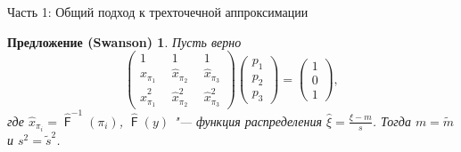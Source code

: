 \documentclass[ucs, notheorems, handout]{beamer}
\newtheorem{proposition}[theorem]{Предложение (Swanson)}
\DeclareMathOperator{\F}{\mathsf{F}}
\begin{document}
	\begin{frame}{Часть 1: Общий подход к трехточечной аппроксимации}
		\begin{proposition}\label{pr1}
			Пусть верно 
			\begin{equation*}
				\begin{pmatrix} 
					1&1&1\\ 
					\hat{x}_{\pi_{1}}~~ &  \hat{x}_{\pi_{2}}~~  & \hat{x}_{\pi_{3}} \\ 
					\hat{x}_{\pi_{1}}^{2}~~&\hat{x}_{\pi_{2}}^{2}~~  &\hat{x}_{\pi_{3}}^{2}
				\end{pmatrix}
				\begin{pmatrix}p_{1}\\p_{2}\\ p_{3}\end{pmatrix}= \begin{pmatrix}1\\0\\1 \end{pmatrix},\label{4}
			\end{equation*}
			где $\hat{x}_{\pi_{i}} = \hat{\F}^{-1}(\pi_{i})$, $\hat{\F}(y)$ "--- функция распределения $\displaystyle{\hat{\xi} = \frac{\xi-m}{s}}$. Тогда $m=\tilde{m}$ и $s^{2} = \tilde{s}^{2}$.
		\end{proposition}
		
		
	\end{frame}
	
\end{document}
